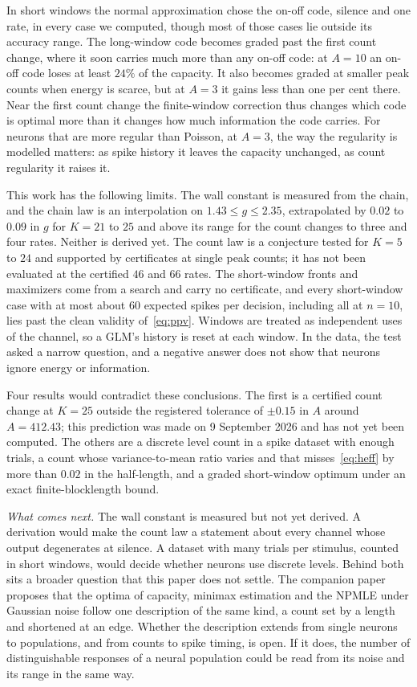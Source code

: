 \documentclass[journal]{IEEEtran}
\begin{document}
In short windows the normal approximation chose the on-off code, silence and one rate, in every case we computed, though most of
those cases lie outside its accuracy range. The long-window code becomes graded past the first count change, where it soon carries
much more than any on-off code: at $A = 10$ an on-off code loses at least $24\%$ of the capacity. It also becomes graded at smaller peak counts when energy is
scarce, but at $A = 3$ it gains less than one per cent there. Near the first count change the finite-window correction thus changes which code is optimal more than
it changes how much information the code carries. For neurons that are more regular than Poisson, at $A = 3$, the way the regularity is
modelled matters: as spike history it leaves the capacity unchanged, as count regularity it raises it.

This work has the following limits. The wall constant is measured from the chain, and the chain law is an interpolation on $1.43
\le g \le 2.35$, extrapolated by $0.02$ to $0.09$ in $g$ for $K = 21$ to $25$ and above its range for the count changes to three and
four rates. Neither is derived yet. The count law is a conjecture tested for $K = 5$ to $24$ and supported by certificates at single peak
counts; it has not been evaluated at the certified $46$ and $66$ rates. The short-window fronts and maximizers come from a search and
carry no certificate, and every short-window case with at most about $60$ expected spikes per decision, including all at $n = 10$, lies
past the clean validity of~\eqref{eq:ppv}. Windows are treated as independent uses of the channel, so a GLM's history is reset at each window.
In the data, the test asked a narrow question, and a negative answer does not show that neurons ignore energy or information.

Four results would contradict these conclusions. The first is a certified count change at $K = 25$ outside the registered tolerance of
$\pm 0.15$ in $A$ around $A = 412.43$; this prediction was made on 9 September 2026 and has not yet been computed. The others are a
discrete level count in a spike dataset with enough trials, a count whose variance-to-mean ratio varies and that misses~\eqref{eq:heff}
by more than $0.02$ in the half-length, and a graded short-window optimum under an exact finite-blocklength bound.

\emph{What comes next.} The wall constant is measured but not yet derived. A derivation would make the count law a statement about every
channel whose output degenerates at silence. A dataset with many trials per stimulus, counted in short windows, would decide whether
neurons use discrete levels. Behind both sits a broader question that this paper does not settle. The companion paper~\cite{Paper1}
proposes that the optima of capacity, minimax estimation and the NPMLE under Gaussian noise follow one description of the same kind, a
count set by a length and shortened at an edge. Whether the description extends from single neurons to populations, and from counts to
spike timing, is open. If it does, the number of distinguishable responses of a neural population could be read from its noise and
its range in the same way.
\end{document}
